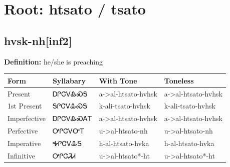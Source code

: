 \documentclass{article}%
\begin{document}
%
\normalsize%
\section*{Root: htsato / tsato}%
\subsection*{hvsk-nh[inf2]}%
\textbf{Definition: }%
he/she is preaching%
\\[0.5em]%
\begin{tabular}{|l|l|l|l|}%
\hline%
\textbf{Form}&\textbf{Syllabary}&\textbf{With Tone}&\textbf{Toneless}\\%
\hline%
Present&ᎠᎵᏣᏙᎲᏍᎦ&a{-}>al{-}htsato{-}hvhsk&a{-}>al{-}htsato{-}hvhsk\\%
1st Present&ᎦᎵᏣᏙᎲᏍᎦ&k{-}ali{-}tsato{-}hvhsk&k{-}ali{-}tsato{-}hvhsk\\%
Imperfective&ᎠᎵᏣᏙᎲᏍᎪᎢ&a{-}>al{-}htsato{-}hvhsk&a{-}>al{-}htsato{-}hvhsk\\%
Perfective&ᎤᎵᏣᏙᏅᎢ&u{-}>al{-}htsato{-}nh&u{-}>al{-}htsato{-}nh\\%
Imperative&ᎭᎵᏣᏙᎲᎦ&h{-}al{-}htsato{-}hvka&h{-}al{-}htsato{-}hvka\\%
Infinitive&ᎤᎵᏣᏘᏗ&u{-}>al{-}htsato*{-}ht&u{-}>al{-}htsato*{-}ht\\%
\hline%
\end{tabular}%
\\[1em]%
\end{document}
